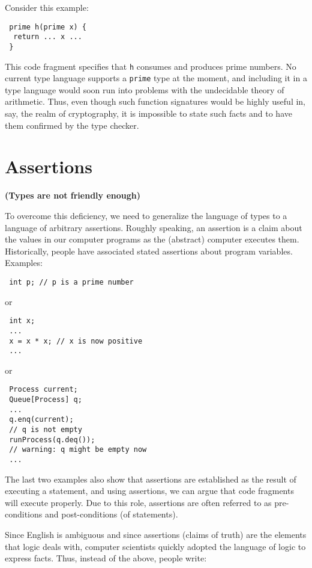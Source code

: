 \documentclass[11pt]{article}
\begin{document}
Consider this example:

\begin{verbatim}
 prime h(prime x) { 
  return ... x ...
 }
\end{verbatim}
This code fragment specifies that {\tt h} consumes and produces
prime numbers. No current type language supports a {\tt prime} type
at the moment, and including it in a type language would soon run into
problems with the undecidable theory of arithmetic. Thus, even though such
function signatures would be highly useful in, say, the realm of
cryptography, it is impossible to state such facts and to have them
confirmed by the type checker.


\section{Assertions}

{\bf (Types are not friendly enough)}

To overcome this deficiency, we need to generalize the language of types
  to a language of arbitrary assertions. Roughly speaking, an assertion is
  a claim about the values in our computer programs as the (abstract)
  computer executes them. Historically, people have associated stated
  assertions about program variables. Examples: 

\begin{verbatim}
 int p; // p is a prime number
\end{verbatim}

or

\begin{verbatim}
 int x; 
 ...
 x = x * x; // x is now positive 
 ...  
\end{verbatim}

or 

\begin{verbatim}
 Process current; 
 Queue[Process] q; 
 ... 
 q.enq(current); 
 // q is not empty 
 runProcess(q.deq()); 
 // warning: q might be empty now 
 ...
\end{verbatim}

The last two examples also show that assertions are established as the
result of executing a statement, and using assertions, we can argue that
code fragments will execute properly. Due to this role, assertions are
often referred to as pre-conditions and post-conditions (of statements). 


Since English is ambiguous and since assertions (claims of truth) are
  the elements that logic deals with, computer scientists quickly adopted
  the language of logic to express facts. Thus, instead of the above,
  people write: 
\end{document}
